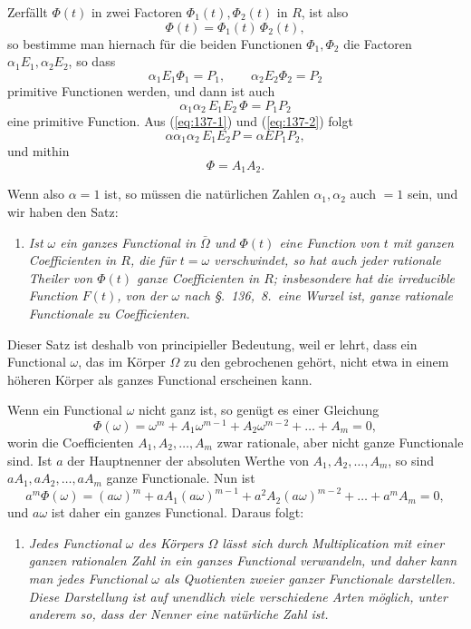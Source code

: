 \documentclass[12pt,a4paper]{article}
\theoremstyle{definition}
\begin{document}
Zerfällt $\Phi(t)$ in zwei Factoren $\Phi_1(t),\Phi_2(t)$ in $R$, ist also
\[
\Phi(t) = \Phi_1(t)\,\Phi_2(t),
\]
so bestimme man hiernach für die beiden Functionen $\Phi_1,\Phi_2$ die Factoren $\alpha_1E_1,\alpha_2E_2$, so dass
\[
\alpha_1E_1\Phi_1 = P_1,\qquad \alpha_2E_2\Phi_2 = P_2
\]
primitive Functionen werden, und dann ist auch
\begin{equation}\label{eq:137-2}
\alpha_1\alpha_2\,E_1E_2\,\Phi = P_1P_2
\end{equation}
eine primitive Function. Aus (\ref{eq:137-1}) und (\ref{eq:137-2}) folgt
\begin{equation}\label{eq:137-3}
\alpha\alpha_1\alpha_2\,E_1E_2P = \alpha EP_1P_2,
\end{equation}
und mithin
\begin{equation}\label{eq:137-4}
\Phi = A_1A_2.
\end{equation}

Wenn also $\alpha=1$ ist, so müssen die natürlichen Zahlen $\alpha_1,\alpha_2$ auch $=1$ sein, und wir haben den Satz:

\begin{enumerate}[label=\arabic*., resume]
\item \textit{Ist $\omega$ ein ganzes Functional in $\bar{\Omega}$ und $\Phi(t)$ eine Function von $t$ mit ganzen Coefficienten in $R$, die für $t=\omega$ verschwindet, so hat auch jeder rationale Theiler von $\Phi(t)$ ganze Coefficienten in $R$; insbesondere hat die irreducible Function $F(t)$, von der $\omega$ nach \S.~136,~8.\ eine Wurzel ist, ganze rationale Functionale zu Coefficienten.}
\end{enumerate}

Dieser Satz ist deshalb von principieller Bedeutung, weil er lehrt, dass ein Functional $\omega$, das im Körper $\Omega$ zu den gebrochenen gehört, nicht etwa in einem höheren Körper als ganzes Functional erscheinen kann.

Wenn ein Functional $\omega$ nicht ganz ist, so genügt es einer Gleichung
\[
\Phi(\omega) = \omega^m + A_1\omega^{m-1} + A_2\omega^{m-2} + \dots + A_m = 0,
\]
worin die Coefficienten $A_1,A_2,\dots,A_m$ zwar rationale, aber nicht ganze Functionale sind. Ist $a$ der Hauptnenner der absoluten Werthe von $A_1,A_2,\dots,A_m$, so sind $aA_1,aA_2,\dots,aA_m$ ganze Functionale. Nun ist
\[
a^m\Phi(\omega) = (a\omega)^m + aA_1(a\omega)^{m-1} + a^2A_2(a\omega)^{m-2} + \dots + a^mA_m = 0,
\]
und $a\omega$ ist daher ein ganzes Functional. Daraus folgt:

\begin{enumerate}[label=\arabic*., resume]
\item \textit{Jedes Functional $\omega$ des Körpers $\Omega$ lässt sich durch Multiplication mit einer ganzen rationalen Zahl in ein ganzes Functional verwandeln, und daher kann man jedes Functional $\omega$ als Quotienten zweier ganzer Functionale darstellen. Diese Darstellung ist auf unendlich viele verschiedene Arten möglich, unter anderem so, dass der Nenner eine natürliche Zahl ist.}
\end{enumerate}
\end{document}
